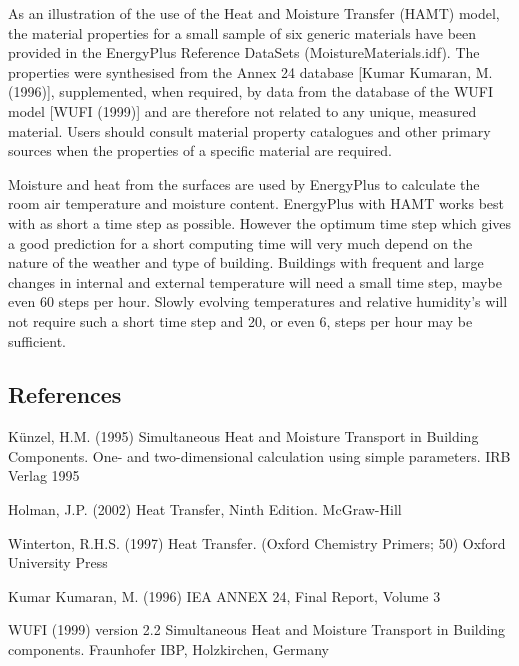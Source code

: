 As an illustration of the use of the Heat and Moisture Transfer (HAMT) model, the material properties for a small sample of six generic materials have been provided in the EnergyPlus Reference DataSets (MoistureMaterials.idf). The properties were synthesised from the Annex 24 database {[}Kumar Kumaran, M. (1996){]}, supplemented, when required, by data from the database of the WUFI model {[}WUFI (1999){]} and are therefore not related to any unique, measured material. Users should consult material property catalogues and other primary sources when the properties of a specific material are required.

Moisture and heat from the surfaces are used by EnergyPlus to calculate the room air temperature and moisture content. EnergyPlus with HAMT works best with as short a time step as possible. However the optimum time step which gives a good prediction for a short computing time will very much depend on the nature of the weather and type of building. Buildings with frequent and large changes in internal and external temperature will need a small time step, maybe even 60 steps per hour. Slowly evolving temperatures and relative humidity's will not require such a short time step and 20, or even 6, steps per hour may be sufficient.

\subsection{References}\label{references-012}

Künzel, H.M. (1995) Simultaneous Heat and Moisture Transport in Building Components. One- and two-dimensional calculation using simple parameters. IRB Verlag 1995

Holman, J.P. (2002) Heat Transfer, Ninth Edition. McGraw-Hill

Winterton, R.H.S. (1997) Heat Transfer. (Oxford Chemistry Primers; 50) Oxford University Press

Kumar Kumaran, M. (1996) IEA ANNEX 24, Final Report, Volume 3

WUFI (1999) version 2.2 Simultaneous Heat and Moisture Transport in Building components. Fraunhofer IBP, Holzkirchen, Germany
